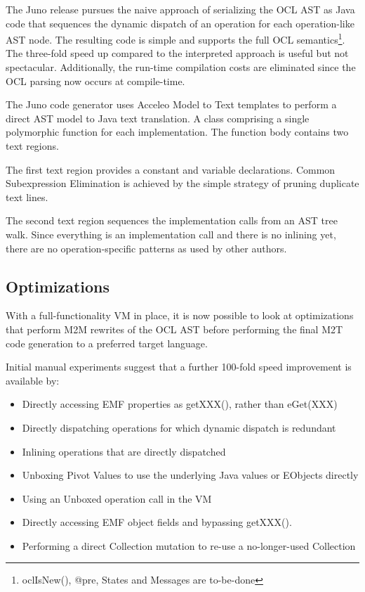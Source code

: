 \documentclass{sig-alternate}
\begin{document}
The Juno release pursues the naive approach of serializing the OCL AST as Java code that sequences the
dynamic dispatch of an operation for each operation-like AST node. The resulting code is simple and supports the
full OCL semantics\footnote{ oclIsNew(), @pre, States and Messages are to-be-done}. The three-fold speed up compared to the interpreted approach is useful but not spectacular. Additionally, the run-time compilation costs are eliminated since the OCL parsing now occurs at compile-time. 

The Juno code generator uses Acceleo Model to Text templates to perform a direct AST model to Java text translation. A class comprising a single polymorphic function for each implementation. The function body contains two text regions. 

The first text region provides a constant and variable declarations. Common Subexpression Elimination is achieved by the simple strategy of pruning duplicate text lines. 

The second text region sequences the implementation calls from an AST tree walk. Since everything is an implementation call and there is no inlining yet, there are no operation-specific patterns as used by other authors.

\subsection{Optimizations}

With a full-functionality VM in place, it is now possible to look at optimizations that perform M2M rewrites of the OCL AST before performing the final M2T code generation to a preferred target language.

Initial manual experiments suggest that a further 100-fold speed improvement is available by:
\begin{itemize}
\item Directly accessing EMF properties as getXXX(), rather than eGet(XXX) 
\item Directly dispatching operations for which dynamic dispatch is redundant
\item Inlining operations that are directly dispatched
\item Unboxing Pivot Values to use the underlying Java values or EObjects directly
\item Using an Unboxed operation call in the VM 
\item Directly accessing EMF object fields and bypassing getXXX().
\item Performing a direct Collection mutation to re-use a no-longer-used Collection 
\end{itemize}
\end{document}
